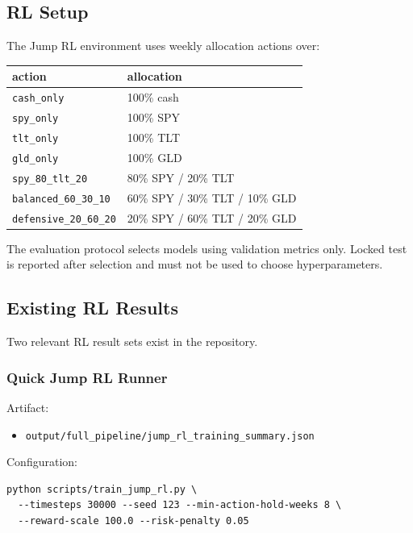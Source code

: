\subsection{RL Setup}\label{rl-setup}

The Jump RL environment uses weekly allocation actions over:

{\def\LTcaptype{none} %
\begin{longtable}[]{@{}ll@{}}
\toprule\noalign{}
action & allocation \\
\midrule\noalign{}
\endhead
\bottomrule\noalign{}
\endlastfoot
\texttt{cash\_only} & 100\% cash \\
\texttt{spy\_only} & 100\% SPY \\
\texttt{tlt\_only} & 100\% TLT \\
\texttt{gld\_only} & 100\% GLD \\
\texttt{spy\_80\_tlt\_20} & 80\% SPY / 20\% TLT \\
\texttt{balanced\_60\_30\_10} & 60\% SPY / 30\% TLT / 10\% GLD \\
\texttt{defensive\_20\_60\_20} & 20\% SPY / 60\% TLT / 20\% GLD \\
\end{longtable}
}

The evaluation protocol selects models using validation metrics only.
Locked test is reported after selection and must not be used to choose
hyperparameters.

\subsection{Existing RL Results}\label{existing-rl-results}

Two relevant RL result sets exist in the repository.

\subsubsection{Quick Jump RL Runner}\label{quick-jump-rl-runner}

Artifact:

\begin{itemize}
\tightlist
\item
  \texttt{output/full\_pipeline/jump\_rl\_training\_summary.json}
\end{itemize}

Configuration:

\begin{verbatim}
python scripts/train_jump_rl.py \
  --timesteps 30000 --seed 123 --min-action-hold-weeks 8 \
  --reward-scale 100.0 --risk-penalty 0.05
\end{verbatim}

